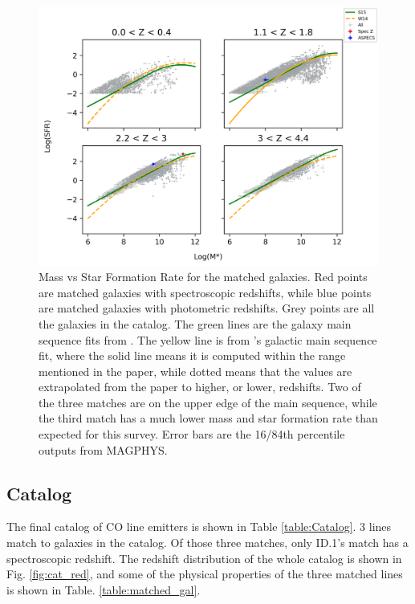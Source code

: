 \begin{figure}[!htbp]
\centering \includegraphics[width=120mm]{Survey/No_Cut_Mstar_vs_SFR_all_closest_sep_1_0_sn_fid_60.png}
\caption{Mass vs Star Formation Rate for the matched galaxies. Red points are matched galaxies with spectroscopic redshifts, while blue points are matched galaxies with photometric redshifts. Grey points are all the galaxies in the catalog. The green lines are the galaxy main sequence fits from \cite{schreiber2015herschel}. The yellow line is from \cite{Whitaker_2014}'s galactic main sequence fit, where the solid line means it is computed within the range mentioned in the paper, while dotted means that the values are extrapolated from the paper to higher, or lower, redshifts. Two of the three matches are on the upper edge of the main sequence, while the third match has a much lower mass and star formation rate than expected for this survey. Error bars are the 16/84th percentile outputs from MAGPHYS.}
\label{fig:Cross_match}
\end{figure}

\subsection{Catalog}

The final catalog of CO line emitters is shown in Table \ref{table:Catalog}. 3 lines match to galaxies in the catalog. Of those three matches, only ID.1's match has a spectroscopic redshift. The redshift distribution of the whole catalog is shown in Fig. \ref{fig:cat_red}, and some of the physical properties of the three matched lines is shown in Table. \ref{table:matched_gal}.

